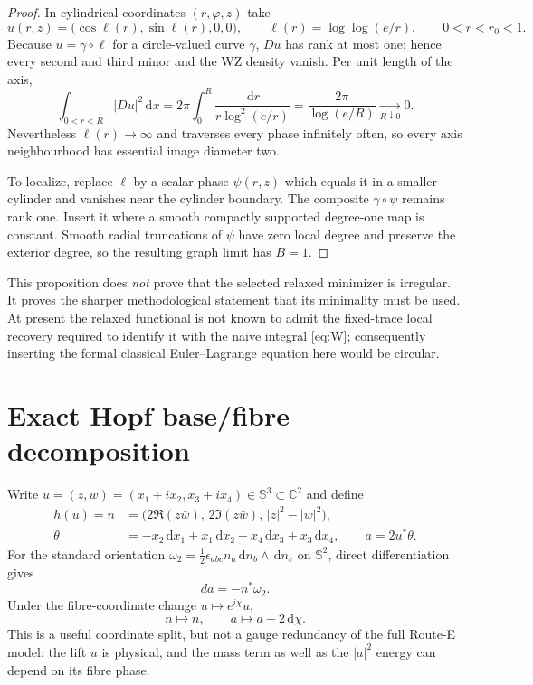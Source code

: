 \documentclass[11pt]{article}
\newcommand{\dd}{\,\mathrm d}
\newcommand{\SSS}{\mathbb S}
\begin{document}
\begin{proof}
In cylindrical coordinates $(r,\varphi,z)$ take
\begin{equation}
 u(r,z)=\bigl(\cos\ell(r),\sin\ell(r),0,0\bigr),\qquad
 \ell(r)=\log\log(e/r),\qquad 0<r<r_0<1.        \label{eq:rank-one}
\end{equation}
Because $u=\gamma\circ\ell$ for a circle-valued curve $\gamma$, $Du$ has
rank at most one; hence every second and third minor and the WZ density
vanish.  Per unit length of the axis,
\begin{equation}
 \int_{0<r<R}|Du|^2\dd x
 =2\pi\int_0^R\frac{\dd r}{r\log^2(e/r)}
 =\frac{2\pi}{\log(e/R)}\xrightarrow[R\downarrow0]{}0.   \label{eq:tail}
\end{equation}
Nevertheless $\ell(r)\to\infty$ and traverses every phase infinitely often,
so every axis neighbourhood has essential image diameter two.

To localize, replace $\ell$ by a scalar phase $\psi(r,z)$ which equals it in
a smaller cylinder and vanishes near the cylinder boundary.  The composite
$\gamma\circ\psi$ remains rank one.  Insert it where a smooth compactly
supported degree-one map is constant.  Smooth radial truncations of $\psi$
have zero local degree and preserve the exterior degree, so the resulting
graph limit has $B=1$.
\end{proof}

This proposition does \emph{not} prove that the selected relaxed minimizer is
irregular.  It proves the sharper methodological statement that its
minimality must be used.  At present the relaxed functional is not known to
admit the fixed-trace local recovery required to identify it with the naive
integral \eqref{eq:W}; consequently inserting the formal classical
Euler--Lagrange equation here would be circular.

\section{Exact Hopf base/fibre decomposition}

Write $u=(z,w)=(x_1+ix_2,x_3+ix_4)\in\SSS^3\subset\mathbb C^2$ and define
\begin{align}
 h(u)=n&=\bigl(2\Re(z\bar w),\,2\Im(z\bar w),\,|z|^2-|w|^2\bigr),
 \label{eq:hopf}\\
 \theta&=-x_2\dd x_1+x_1\dd x_2-x_4\dd x_3+x_3\dd x_4,
 \qquad a=2u^*\theta.                                  \label{eq:connection}
\end{align}
For the standard orientation
$\omega_2=\frac12\epsilon_{abc}n_a\dd n_b\wedge\dd n_c$ on $\SSS^2$,
direct differentiation gives
\begin{equation}
 da=-n^*\omega_2.                                      \label{eq:curvature}
\end{equation}
Under the fibre-coordinate change $u\mapsto e^{i\chi}u$,
\begin{equation}
 n\mapsto n,\qquad a\mapsto a+2\dd\chi.               \label{eq:gauge}
\end{equation}
This is a useful coordinate split, but not a gauge redundancy of the full
Route-E model: the lift $u$ is physical, and the mass term as well as the
$|a|^2$ energy can depend on its fibre phase.
\end{document}
